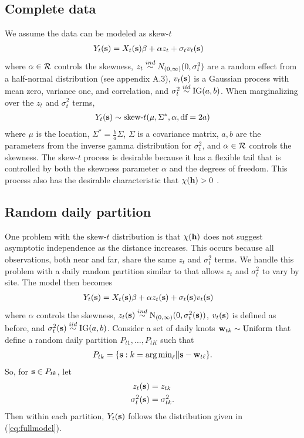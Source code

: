 \documentclass[11pt]{article}
\begin{document}
\subsection{Complete data}\label{s:data}
We assume the data can be modeled as skew-$t$ \citep{Zhang2010}
\begin{align} \label{eq:fullmodel}
  Y_t(\mbox{\bf s}) &= X_t(\mbox{\bf s}) \beta + \alpha z_t + \sigma_t v_t(\mbox{\bf s})
\end{align}
where $\alpha \in {\cal R}$ controls the skewness, $z_{t} \stackrel{ind}{\sim} N_{(0, \infty)}(0, \sigma^2_t)$ are a random effect from a half-normal distribution (see appendix A.3), $v_t(\mbox{\bf s})$ is a Gaussian process with mean zero, variance one, and \Matern correlation, and $\sigma^2_t \stackrel{iid}{\sim} \text{IG}(a, b)$.
When marginalizing over the $z_t$ and $\sigma^2_t$ terms,
\begin{align*}
  Y_t(\mbox{\bf s}) \sim \text{skew-}t (\mu, \Sigma^*, \alpha, \text{df} = 2a)
\end{align*}
where $\mu$ is the location, $\Sigma^* = \frac{ b }{ a } \Sigma$, $\Sigma$ is a \Matern covariance matrix, $a, b$ are the parameters from the inverse gamma distribution for $\sigma^2_t$, and $\alpha \in {\cal R}$ controls the skewness.
The skew-$t$ process is desirable because it has a flexible tail that is controlled by both the skewness parameter $\alpha$ and the degrees of freedom.
This process also has the desirable characteristic that $\chi(\mbox{\bf h}) > 0$ \citep{Padoan2011}.

\subsection{Random daily partition}\label{s:part}
One problem with the skew-$t$ distribution is that $\chi(\mbox{\bf h})$ does not suggest asymptotic independence as the distance increases.
This occurs because all observations, both near and far, share the same $z_t$ and $\sigma^2_t$ terms.
We handle this problem with a daily random partition similar to \citet{Huser2014} that allows $z_t$ and $\sigma^2_t$ to vary by site.
The model then becomes
\begin{align}
  Y_t(\mbox{\bf s}) &= X_t(\mbox{\bf s}) \beta + \alpha z_t(\mbox{\bf s}) + \sigma_t(\mbox{\bf s}) v_t(\mbox{\bf s})
\end{align}
where $\alpha$ controls the skewness, $z_t(\mbox{\bf s}) \stackrel{ind}{\sim} \text{N}_{(0, \infty)}(0, \sigma^2_t(\mbox{\bf s}))$, $v_t(\mbox{\bf s})$ is defined as before, and $\sigma^2_t(\mbox{\bf s}) \stackrel{iid}{\sim} \text{IG}(a, b)$.
Consider a set of daily knots $\mbox{\bf w}_{tk} \sim \text{Uniform}$ that define a random daily partition $P_{t1}, \ldots, P_{tK}$ such that
\begin{align*}
  P_{tk} = \{ \mbox{\bf s} : k = {\mathop{\rm arg\, min}}_\ell || \mbox{\bf s} - \mbox{\bf w}_{t\ell} \}.
\end{align*}
So, for $\mbox{\bf s} \in P_{tk}$, let
\begin{align}
  z_t(\mbox{\bf s}) &= z_{tk} \label{eq:sitez}\\
  \sigma^2_t(\mbox{\bf s}) &= \sigma^2_{tk} \label{eq:sitesig}.
\end{align}
Then within each partition, $Y_t(\mbox{\bf s})$ follows the distribution given in (\ref{eq:fullmodel}).
\end{document}
